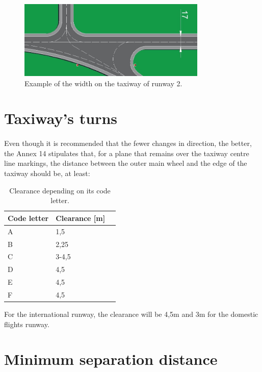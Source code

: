 	\begin{figure}[H]
		\centering
		\includegraphics[clip, trim=0.03cm 0cm 0cm 0.03cm, width=0.8\textwidth]{./images/taxiway/width2}
		\caption{Example of the width on the taxiway of runway 2.} %
		\label{} %
	\end{figure}
	
	\section{Taxiway's turns}
	\paragraph{}Even though it is recommended that the fewer changes in direction, the better, the Annex 14 stipulates that, for a plane that remains over the taxiway centre line markings, the distance between the outer main wheel and the edge of the taxiway should be, at least:
	
	\begin{table}[htb]
		\centering
		\begin{tabular}{ll p{5cm}}
			\toprule[2pt]
			Code letter & Clearance [m]\\
			\midrule[1pt]
			A & 1,5\\
			B & 2,25 \\
			C & 3-4,5\\
			D & 4,5\\
			E & 4,5\\
			F & 4,5\\
			\bottomrule[2pt]
		\end{tabular}
		\caption{Clearance depending on its code letter.}
		\label{}
	\end{table}

	For the international runway, the clearance will be 4,5m and 3m for the domestic flights runway.
	
	\section{Minimum separation distance}
